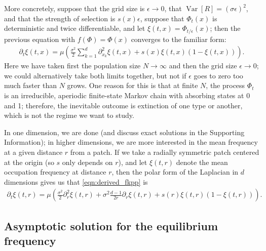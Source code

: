 \documentclass{article}
\DeclareMathOperator{\var}{Var}
\begin{document}
More concretely, suppose that the grid size is $\epsilon \to 0$, 
that $\var[R] = (\sigma \epsilon)^2$, and that the strength of selection is $s(x) \epsilon$,
suppose that $\Phi_t(x)$ is deterministic and twice differentiable,
and let $\xi(t,x) = \Phi_{t/\epsilon}(x)$;
then the previous equation with $f(\Phi) = \Phi(x)$ converges to the familiar form:
\begin{align}
  \label{eqn:derived_fkpp}
  \partial_t \xi(t,x) = \mu \left( \frac{\sigma^2}{2} \sum_{k=1}^d \partial_{x_k}^2 \xi(t,x) + s(x) \xi(t,x) (1-\xi(t,x)) \right) .
\end{align}
Here we have taken first the population size $N \to \infty$ and then the grid size $\epsilon \to 0$;
we could alternatively take both limits together, but not if $\epsilon$ goes to zero too much faster than $N$ grows.
One reason for this is that at finite $N$,
the process $\Phi_t$ is an irreducible, aperiodic finite-state Markov chain with absorbing states at 0 and 1;
therefore, the inevitable outcome is extinction of one type or another,
which is not the regime we want to study.

In one dimension, we are done (and discuss exact solutions in the Supporting Information);
in higher dimensions, we are more interested in the mean frequency at a given distance $r$ from a patch.
If we take a radially symmetric patch centered at the origin (so $s$ only depends on $r$), 
and let $\xi(t,r)$ denote the mean occupation frequency at distance $r$,
then the polar form of the Laplacian in $d$ dimensions gives us that \eqref{eqn:derived_fkpp} is
\begin{align}
  \label{eqn:radial_fkpp}
  \partial_t \xi(t,r) = \mu \left( \frac{\sigma^2}{2} \partial_{r}^2 \xi(t,r) + \sigma^2\frac{d-1}{2r} \partial_r \xi(t,r) + s(r) \xi(t,r) (1-\xi(t,r)) \right) .
\end{align}


\subsection[Asymptotics]{Asymptotic solution for the equilibrium frequency} 
\label{apx:asymptotics}
\end{document}

